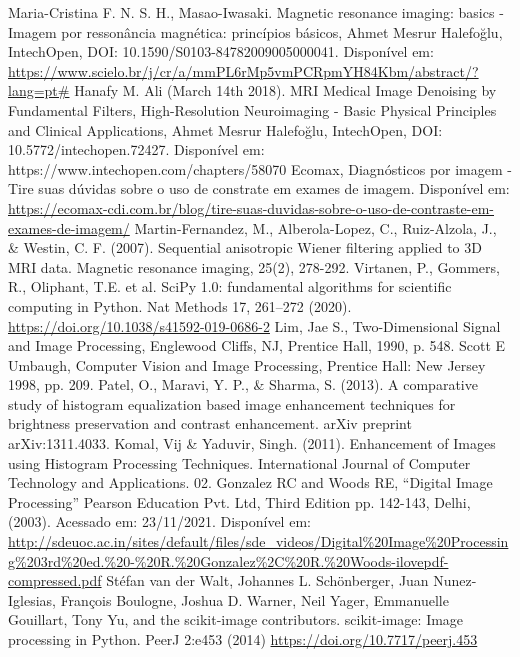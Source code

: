 \documentclass[conference]{IEEEtran}
\begin{document}
\begin{thebibliography}{00}
 Maria-Cristina F. N. S. H., Masao-Iwasaki. Magnetic resonance imaging: basics - Imagem por ressonância magnética: princípios básicos, Ahmet Mesrur Halefoğlu, IntechOpen, DOI: 10.1590/S0103-84782009005000041. Disponível em: \url{https://www.scielo.br/j/cr/a/mmPL6rMp5vmPCRpmYH84Kbm/abstract/?lang=pt#}
 Hanafy M. Ali (March 14th 2018). MRI Medical Image Denoising by Fundamental Filters, High-Resolution Neuroimaging - Basic Physical Principles and Clinical Applications, Ahmet Mesrur Halefoğlu, IntechOpen, DOI: 10.5772/intechopen.72427. Disponível em: https://www.intechopen.com/chapters/58070
 Ecomax, Diagnósticos por imagem - Tire suas dúvidas sobre o uso de constrate em exames de imagem. Disponível em: \url{https://ecomax-cdi.com.br/blog/tire-suas-duvidas-sobre-o-uso-de-contraste-em-exames-de-imagem/}
 Martin-Fernandez, M., Alberola-Lopez, C., Ruiz-Alzola, J., \& Westin, C. F. (2007). Sequential anisotropic Wiener filtering applied to 3D MRI data. Magnetic resonance imaging, 25(2), 278-292.
 Virtanen, P., Gommers, R., Oliphant, T.E. et al. SciPy 1.0: fundamental algorithms for scientific computing in Python. Nat Methods 17, 261–272 (2020). \url{https://doi.org/10.1038/s41592-019-0686-2}
 Lim, Jae S., Two-Dimensional Signal and Image Processing, Englewood Cliffs, NJ, Prentice Hall, 1990, p. 548.
 Scott E Umbaugh, Computer Vision and Image Processing, Prentice Hall: New Jersey 1998, pp. 209.
 Patel, O., Maravi, Y. P., \& Sharma, S. (2013). A comparative study of histogram equalization based image enhancement techniques for brightness preservation and contrast enhancement. arXiv preprint arXiv:1311.4033.
 Komal, Vij \& Yaduvir, Singh. (2011). Enhancement of Images using Histogram Processing Techniques. International Journal of Computer Technology and Applications. 02.
 Gonzalez RC and Woods RE, “Digital Image Processing” Pearson Education Pvt. Ltd, Third Edition pp. 142-143, Delhi, (2003). Acessado em: 23/11/2021. Disponível em: \url{http://sdeuoc.ac.in/sites/default/files/sde_videos/Digital%20Image%20Processing%203rd%20ed.%20-%20R.%20Gonzalez%2C%20R.%20Woods-ilovepdf-compressed.pdf}
 Stéfan van der Walt, Johannes L. Schönberger, Juan Nunez-Iglesias, François Boulogne, Joshua D. Warner, Neil Yager, Emmanuelle Gouillart, Tony Yu, and the scikit-image contributors. scikit-image: Image processing in Python. PeerJ 2:e453 (2014) \url{https://doi.org/10.7717/peerj.453}

\end{thebibliography}
\end{document}
